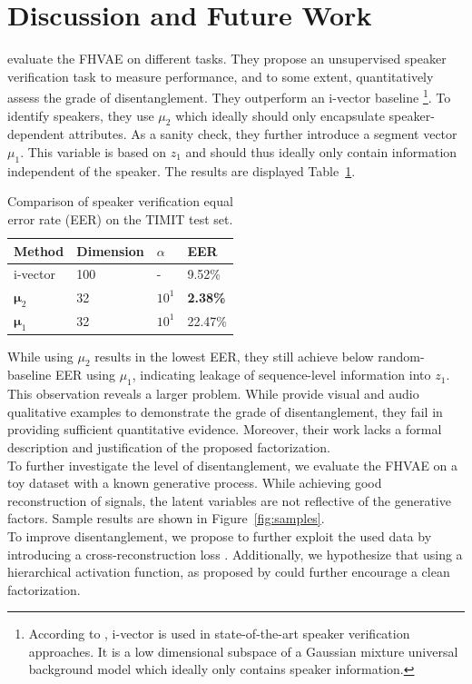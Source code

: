 \documentclass{article} %
\begin{document}
\section*{Discussion and Future Work}
\citet{hsu2017unsupervised} evaluate the FHVAE on different tasks. They propose an unsupervised speaker verification task to measure performance, and to some extent, quantitatively assess the grade of disentanglement. They outperform an i-vector baseline \footnote{According to \citet{hsu2017unsupervised}, i-vector is used in state-of-the-art speaker verification approaches. It is a low dimensional subspace of a Gaussian mixture universal background model which ideally only contains speaker information.}. To identify speakers, they use $\mu_2$ which ideally should only encapsulate speaker-dependent attributes. As a sanity check, they further introduce a segment vector $\mu_1$. This variable is based on $z_1$ and should thus ideally only contain information independent of the speaker. The results are displayed Table~\ref{tab:eer}.
\begin{table}[t]
	\caption{Comparison of speaker verification equal error rate (EER) on the TIMIT test set.}
	\centering
	\begin{tabular}{llll}
		\toprule
		Method 				& Dimension 	& $\alpha$ 		& EER  				 \\
		\midrule\midrule
		\multirow{1}{*}{i-vector}
		& 100   & -     & 9.52\%    \\
		\midrule
		\multirow{1}{*}{$\bm{\mu}_2$}  	& 32			& $10^1$	& \textbf{2.38\%}  	 	\\
		\midrule
		\multirow{1}{*}{$\bm{\mu}_1$}
	& 32			& $10^1$		& 22.47\%   	\\
		\bottomrule
	\end{tabular}
	\label{tab:eer}
\end{table}
While using $\mu_2$ results in the lowest EER, they still achieve below random-baseline EER using $\mu_1$, indicating leakage of sequence-level information into $z_1$. This observation reveals a larger problem. While \citet{hsu2017unsupervised} provide visual and audio qualitative examples to demonstrate the grade of disentanglement, they fail in providing sufficient quantitative evidence. Moreover, their work lacks a formal description and justification of the proposed factorization.\\
To further investigate the level of disentanglement, we evaluate the FHVAE on a toy dataset with a known generative process. While achieving good reconstruction of signals, the latent variables are not reflective of the generative factors. Sample results are shown in Figure~\ref{fig:samples}.\\
To improve disentanglement, we propose to further exploit the used data by introducing a cross-reconstruction loss \cite{schonfeld2019generalized}. Additionally, we hypothesize that using a hierarchical activation function, as proposed by \citet{shen2018ordered} could further encourage a clean factorization.
\end{document}
